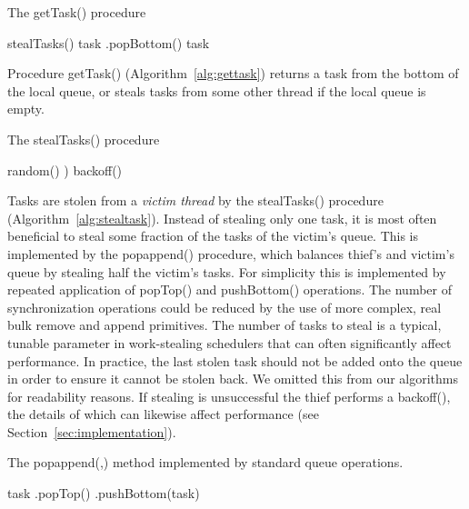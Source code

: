 \documentclass[preprint]{sigplanconf}
\begin{document}
\begin{algorithm}
\begin{algorithmic}[1]
\caption{The getTask() procedure}\label{alg:gettask}
\REPEAT
{}
	\STATE stealTasks()
\ENDIF
        \STATE task  .popBottom()
\RETURN task
\end{algorithmic}
\end{algorithm}

Procedure getTask() (Algorithm~\ref{alg:gettask}) returns a task from the 
bottom of the local queue, or steals tasks from some other thread if the local
queue is empty.

\begin{algorithm}
\begin{algorithmic}[1]
\caption{The stealTasks() procedure}\label{alg:stealtask}
\STATE  random() 
\STATE )
	\STATE {}
	\RETURN
\ENDIF
\STATE{}
\STATE backoff()
\end{algorithmic}
\end{algorithm}

Tasks are stolen from a \emph{victim thread} by the stealTasks()
procedure (Algorithm~\ref{alg:stealtask}).  Instead of stealing only
one task, it is most often beneficial to steal some fraction of the
tasks of the victim's queue. This is implemented by the popappend()
procedure, which balances thief's and victim's queue by stealing half
the victim's tasks. For simplicity this is implemented by repeated
application of popTop() and pushBottom() operations. The number of
synchronization operations could be reduced by the use of more
complex, real bulk remove and append primitives. The number of tasks
to steal is a typical, tunable parameter in work-stealing schedulers
that can often significantly affect performance. In practice, the last
stolen task should not be added onto the queue in order to ensure it
cannot be stolen back. We omitted this from our algorithms for
readability reasons.  If stealing is unsuccessful the thief performs a
backoff(), the details of which can likewise affect performance (see
Section~\ref{sec:implementation}).

\begin{algorithm}
\caption{The popappend(,) method implemented by standard queue 
operations.}\label{alg:popappend}
\begin{algorithmic}[1]
\STATE 
\WHILE {}
	\STATE task  .popTop()
		\STATE .pushBottom(task)
	\ELSE
		\RETURN 
	\ENDIF
\STATE 
\ENDWHILE
\RETURN 
\end{algorithmic}
\end{algorithm}
\end{document}
